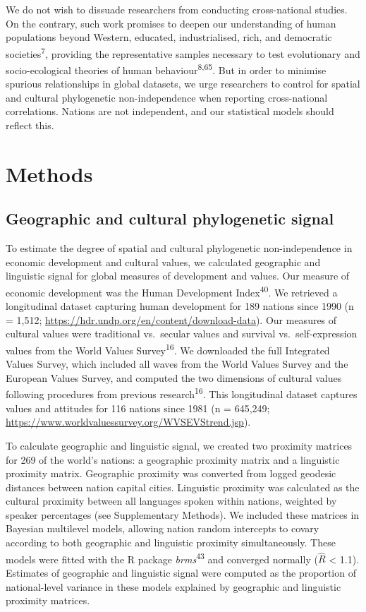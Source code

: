 \documentclass[
  english,
  man,floatsintext]{apa6}
\begin{document}
We do not wish to dissuade researchers from conducting cross-national studies. On the contrary, such work promises to deepen our understanding of human populations beyond Western, educated, industrialised, rich, and democratic societies\textsuperscript{7}, providing the representative samples necessary to test evolutionary and socio-ecological theories of human behaviour\textsuperscript{8,65}. But in order to minimise spurious relationships in global datasets, we urge researchers to control for spatial and cultural phylogenetic non-independence when reporting cross-national correlations. Nations are not independent, and our statistical models should reflect this.

\hypertarget{methods}{%
\section{Methods}\label{methods}}

\hypertarget{geographic-and-cultural-phylogenetic-signal}{%
\subsection{Geographic and cultural phylogenetic signal}\label{geographic-and-cultural-phylogenetic-signal}}

To estimate the degree of spatial and cultural phylogenetic non-independence in economic development and cultural values, we calculated geographic and linguistic signal for global measures of development and values. Our measure of economic development was the Human Development Index\textsuperscript{40}. We retrieved a longitudinal dataset capturing human development for 189 nations since 1990 (n = 1,512; \url{https://hdr.undp.org/en/content/download-data}). Our measures of cultural values were traditional vs.~secular values and survival vs.~self-expression values from the World Values Survey\textsuperscript{16}. We downloaded the full Integrated Values Survey, which included all waves from the World Values Survey and the European Values Survey, and computed the two dimensions of cultural values following procedures from previous research\textsuperscript{16}. This longitudinal dataset captures values and attitudes for 116 nations since 1981 (n = 645,249; \url{https://www.worldvaluessurvey.org/WVSEVStrend.jsp}).

To calculate geographic and linguistic signal, we created two proximity matrices for 269 of the world's nations: a geographic proximity matrix and a linguistic proximity matrix. Geographic proximity was converted from logged geodesic distances between nation capital cities. Linguistic proximity was calculated as the cultural proximity between all languages spoken within nations, weighted by speaker percentages (see Supplementary Methods). We included these matrices in Bayesian multilevel models, allowing nation random intercepts to covary according to both geographic and linguistic proximity simultaneously. These models were fitted with the R package \emph{brms}\textsuperscript{43} and converged normally (\(\hat{R}\) \textless{} 1.1). Estimates of geographic and linguistic signal were computed as the proportion of national-level variance in these models explained by geographic and linguistic proximity matrices.
\end{document}
